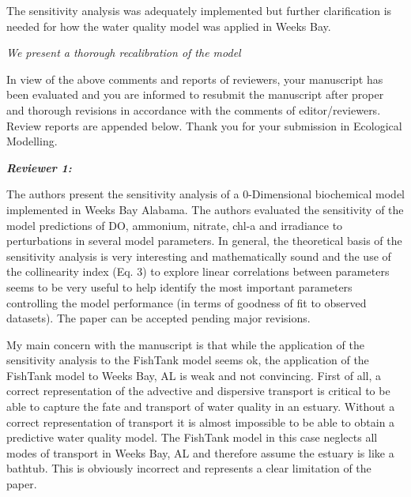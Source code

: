 \documentclass[letterpaper,12pt]{article}\usepackage[]{graphicx}\usepackage[]{color}
\newcommand{\Bigtxt}[1]{\textbf{\textit{#1}}}
\begin{document}
The sensitivity analysis was adequately implemented but further clarification is needed for how the water quality model was applied in Weeks Bay. 

{\it We present a thorough recalibration of the model }

In view of the above comments and reports of reviewers, your manuscript has been evaluated and you are informed to resubmit the manuscript after proper and thorough revisions in accordance with the comments of editor/reviewers. Review reports are appended below. Thank you for your submission in Ecological Modelling. 

\Bigtxt{Reviewer 1:}

The authors present the sensitivity analysis of a 0-Dimensional biochemical model implemented in Weeks Bay Alabama. The authors evaluated the sensitivity of the model predictions of DO, ammonium, nitrate, chl-a and irradiance to perturbations in several model parameters. In general, the theoretical basis of the sensitivity analysis is very interesting and mathematically sound and the use of the collinearity index (Eq. 3) to explore linear correlations between parameters seems to be very useful to help identify the most important parameters controlling the model performance (in terms of goodness of fit to observed datasets). The paper can be accepted pending major revisions. 

My main concern with the manuscript is that while the application of the sensitivity analysis to the FishTank model seems ok, the application of the FishTank model to Weeks Bay, AL is weak and not convincing. First of all, a correct representation of the advective and dispersive transport is critical to be able to capture the fate and transport of water quality in an estuary. Without a correct representation of transport it is almost impossible to be able to obtain a predictive water quality model. The FishTank model in this case neglects all modes of transport in Weeks Bay, AL and therefore assume the estuary is like a bathtub. This is obviously incorrect and represents a clear limitation of the paper.
\end{document}

